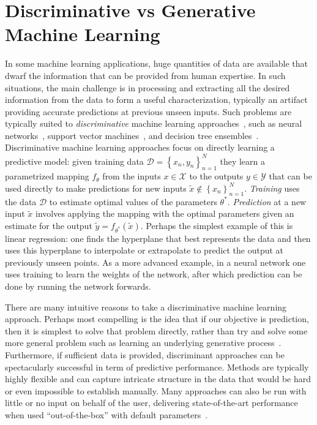 
\section{Discriminative vs Generative Machine Learning}
\label{sec:bayes:discrim}

In some machine learning applications, huge quantities of data are available that dwarf the information
that can be provided from human expertise.  In such situations, the main challenge is in processing
and extracting all the desired information from the data to form a useful characterization,
typically an artifact providing accurate predictions at previous unseen inputs. 
Such problems are typically suited to \emph{discriminative} 
machine learning approaches~\citep{breiman2001statistical,vapnik1998statistical}, such as neural
networks~\citep{rumelhart1986learning,bishop1995neural}, 
support vector machines~\citep{cortes1995support,scholkopf2002learning}, and decision tree 
ensembles~\citep{breiman2001random,rainforth2015canonical}.  Discriminative machine learning approaches
focus on directly learning a predictive model: given training data $\mathcal{D} = \left\{x_n,y_n\right\}_{n=1}^N$
they learn a parametrized mapping $f_{\theta}$ from the inputs $x \in \mathcal{X}$ to the 
outputs $y\in\mathcal{Y}$ that can 
be used directly to make predictions 
for new inputs $\tilde{x} \notin \left\{x_n\right\}_{n=1}^N$.  \emph{Training}
uses the data $\mathcal{D}$ to estimate optimal values of the parameters $\theta^*$. \emph{Prediction}
at a new input $\tilde{x}$ involves applying the mapping with the optimal parameters given an estimate for the output
$\tilde{y} = f_{\theta^*}(\tilde{x})$.  Perhaps the simplest example of this is linear regression: one finds
the hyperplane that best represents the data and then uses this hyperplane to interpolate or extrapolate
to predict the output at previously unseen points.  
As a more advanced example, in a neural network one uses training to learn the
weights of the network, after which prediction can be done by running the network forwards.  

There are many intuitive reasons to take a discriminative machine learning 
approach.  Perhaps most compelling is the
idea that if our objective is prediction, then it is simplest to solve that problem directly, rather
than try and solve some more general problem such as learning an underlying generative 
process~\citep{vapnik1998statistical,breiman2001statistical}. Furthermore, if sufficient
data is provided, discriminant approaches can be spectacularly successful in term of predictive
performance.  Methods are typically highly flexible and can capture intricate structure in the data that
would be hard or even impossible to establish manually.  Many approaches can also be run with little
or no input on behalf of the user, delivering state-of-the-art performance when used
``out-of-the-box'' with default parameters~\citep{rainforth2015canonical}.  

